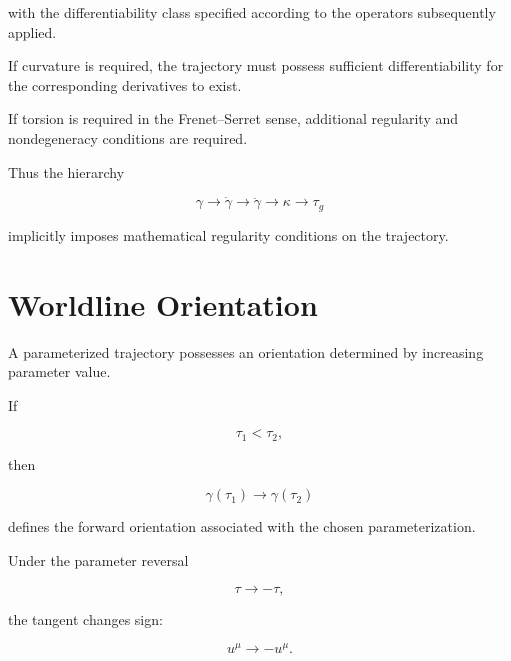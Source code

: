 \documentclass[12pt,oneside]{book}
\begin{document}
with the differentiability class specified according to the
operators subsequently applied.

If curvature is required, the trajectory must possess sufficient
differentiability for the corresponding derivatives to exist.

If torsion is required in the Frenet--Serret sense, additional
regularity and nondegeneracy conditions are required.

Thus the hierarchy

\begin{equation}
    \gamma
    \rightarrow
    \dot{\gamma}
    \rightarrow
    \ddot{\gamma}
    \rightarrow
    \kappa
    \rightarrow
    \tau_g
    \label{eq:worldline-derivative-hierarchy}
\end{equation}

implicitly imposes mathematical regularity conditions on the
trajectory.


\section{Worldline Orientation}
\label{sec:worldline-orientation}

A parameterized trajectory possesses an orientation determined
by increasing parameter value.

If

\begin{equation}
    \tau_1
    <
    \tau_2,
\end{equation}

then

\begin{equation}
    \gamma(\tau_1)
    \longrightarrow
    \gamma(\tau_2)
\end{equation}

defines the forward orientation associated with the chosen
parameterization.

Under the parameter reversal

\begin{equation}
    \tau
    \longrightarrow
    -\tau,
    \label{eq:parameter-reversal}
\end{equation}

the tangent changes sign:

\begin{equation}
    u^\mu
    \longrightarrow
    -u^\mu.
    \label{eq:tangent-reversal}
\end{equation}
\end{document}
